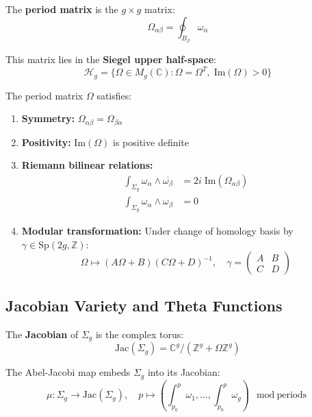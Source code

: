 \begin{definition}
\label{def:period-matrix}
The \textbf{period matrix} is the $g \times g$ matrix:
\begin{equation}
\Omega_{\alpha\beta} = \oint_{B_\beta} \omega_\alpha
\end{equation}

This matrix lies in the \textbf{Siegel upper half-space}:
\begin{equation}
\mathcal{H}_g = \{\Omega \in M_g(\mathbb{C}) : \Omega = \Omega^T, \; \text{Im}(\Omega) > 0\}
\end{equation}
\end{definition}

\begin{theorem}
\label{thm:period-matrix-properties}
The period matrix $\Omega$ satisfies:
\begin{enumerate}
\item \textbf{Symmetry:} $\Omega_{\alpha\beta} = \Omega_{\beta\alpha}$
\item \textbf{Positivity:} $\text{Im}(\Omega)$ is positive definite
\item \textbf{Riemann bilinear relations:}
\begin{align}
\int_{\Sigma_g} \omega_\alpha \wedge \overline{\omega_\beta} &= 2i \; \text{Im}(\Omega_{\alpha\beta})\\
\int_{\Sigma_g} \omega_\alpha \wedge \omega_\beta &= 0
\end{align}
\item \textbf{Modular transformation:} Under change of homology basis by $\gamma \in \text{Sp}(2g, \mathbb{Z})$:
\begin{equation}
\Omega \mapsto (A\Omega + B)(C\Omega + D)^{-1}, \quad \gamma = \begin{pmatrix} A & B \\ C & D \end{pmatrix}
\end{equation}
\end{enumerate}
\end{theorem}

\subsection{Jacobian Variety and Theta Functions}

\begin{definition}
\label{def:jacobian-variety}
The \textbf{Jacobian} of $\Sigma_g$ is the complex torus:
\begin{equation}
\text{Jac}(\Sigma_g) = \mathbb{C}^g / (\mathbb{Z}^g + \Omega \mathbb{Z}^g)
\end{equation}

The Abel-Jacobi map embeds $\Sigma_g$ into its Jacobian:
\begin{equation}
\mu: \Sigma_g \to \text{Jac}(\Sigma_g), \quad p \mapsto \left(\int_{p_0}^p \omega_1, \ldots, \int_{p_0}^p \omega_g\right) \mod \text{periods}
\end{equation}
\end{definition}

